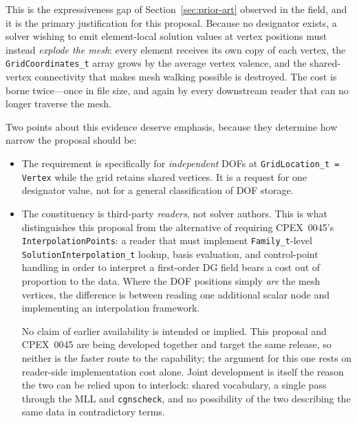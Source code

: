 \documentclass[11pt,letterpaper]{article}
\begin{document}
This is the expressiveness gap of Section~\ref{sec:prior-art} observed
in the field, and it is the primary justification for this proposal.
Because no designator exists, a solver wishing to emit element-local
solution values at vertex positions must instead \emph{explode the
mesh}: every element receives its own copy of each vertex, the
\texttt{GridCoordinates\_t} array grows by the average vertex valence,
and the shared-vertex connectivity that makes mesh walking possible is
destroyed.  The cost is borne twice---once in file size, and again by
every downstream reader that can no longer traverse the mesh.

Two points about this evidence deserve emphasis, because they determine
how narrow the proposal should be:

\begin{itemize}[leftmargin=2em]
\item The requirement is specifically for \emph{independent} DOFs at
  \texttt{GridLocation\_t = Vertex} while the grid retains shared
  vertices.  It is a request for one designator value, not for a
  general classification of DOF storage.
\item The constituency is third-party \emph{readers}, not solver
  authors.  This is what distinguishes this proposal from the
  alternative of requiring CPEX~0045's \texttt{InterpolationPoints}: a
  reader that must implement \texttt{Family\_t}-level
  \texttt{SolutionInterpolation\_t} lookup, basis evaluation, and
  control-point handling in order to interpret a first-order DG field
  bears a cost out of proportion to the data.  Where the DOF positions
  simply \emph{are} the mesh vertices, the difference is between
  reading one additional scalar node and implementing an interpolation
  framework.

  No claim of earlier availability is intended or implied.  This
  proposal and CPEX~0045 are being developed together and target the
  same release, so neither is the faster route to the capability; the
  argument for this one rests on reader-side implementation cost alone.
  Joint development is itself the reason the two can be relied upon to
  interlock: shared vocabulary, a single pass through the MLL and
  \texttt{cgnscheck}, and no possibility of the two describing the same
  data in contradictory terms.
\end{itemize}
\end{document}
